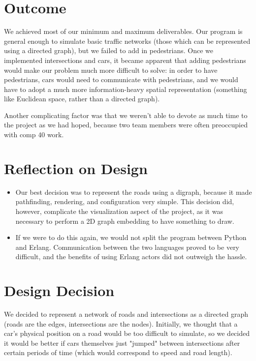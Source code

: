 \documentclass{article}
\begin{document}
\section{Outcome}

We achieved most of our minimum and maximum deliverables. Our program is general enough to simulate basic traffic networks (those which can be represented using a directed graph), but we failed to add in pedestrians. Once we implemented intersections and cars, it became apparent that adding pedestrians would make our problem much more difficult to solve: in order to have pedestrians, cars would need to communicate with pedestrians, and we would have to adopt a much more information-heavy spatial representation (something like Euclidean space, rather than a directed graph). 

Another complicating factor was that we weren't able to devote as much time to the project as we had hoped, because two team members were often preoccupied with comp 40 work.

\section{Reflection on Design}

\begin{itemize}
	\item Our best decision was to represent the roads using a digraph, because it made pathfinding, rendering, and configuration very simple. This decision did, however, complicate the visualization aspect of the project, as it was necessary to perform a 2D graph embedding to have something to draw.

	\item If we were to do this again, we would not split the program between Python and Erlang. Communication between the two languages proved to be very difficult, and the benefits of using Erlang actors did not outweigh the hassle.
\end{itemize}

\section{Design Decision}

We decided to represent a network of roads and intersections as a directed graph (roads are the edges, intersections are the nodes). Initially, we thought that a car's physical position on a road would be too difficult to simulate, so we decided it would be better if cars themselves just "jumped" between intersections after certain periods of time (which would correspond to speed and road length). 
\end{document}
